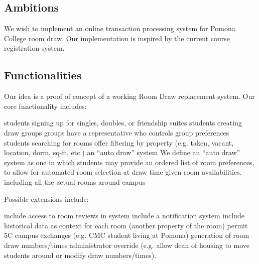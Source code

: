 \subsection{Ambitions}

We wish to implement an online transaction processing system for Pomona College
room draw. Our implementation is inspired by the current course registration
system.

\subsection{Functionalities}

Our idea is a proof of concept of a working Room Draw replacement system. Our
core functionality includes:

\begin{outline}
\1 students signing up for singles, doubles, or friendship suites
\1 students creating draw groups
    \2 groups have a representative who controls group preferences
\1 students searching for rooms
    \2 offer filtering by property (e.g. taken, vacant, location, dorm, sq-ft,
    etc.)
\1 an ``auto draw'' system
    \2 We define an ``auto draw'' system as one in which students may provide an
    ordered list of room preferences, to allow for automated room selection at
    draw time given room availabilities.
\1 including all the actual rooms around campus
\end{outline}

Possible extensions include:

\begin{outline}
\1 include access to room reviews in system
\1 include a notification system
\1 include historical data as context for each room (another property of the
    room)
\1 permit 5C campus exchanges (e.g. CMC student living at Pomona)
\1 generation of room draw numbers/times
\1 administrator override (e.g. allow dean of housing to move students around or modify
    draw numbers/times).
\end{outline}